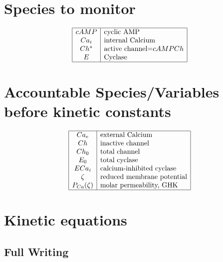 \documentclass[aps,12pt]{revtex4}
\begin{document}
\section{Species to monitor}
\begin{equation*}
\begin{array}{|c|l|}
\hline
	cAMP & \text{cyclic AMP}\\
	Ca_i & \text{internal Calcium}\\
    Ch^\ast & \text{active channel=}cAMPCh\\
    E     & \text{Cyclase} \\	
\hline
\end{array}
\end{equation*}

\section{Accountable Species/Variables before kinetic constants}

\begin{equation*}
\begin{array}{|c|l|}
\hline
	Ca_e & \text{external Calcium}\\
    Ch    & \text{inactive channel}\\
    Ch_0  & \text{total channel}\\
    E_0   & \text{total cyclase} \\	
    ECa_i & \text{calcium-inhibited cyclase}\\
    \zeta & \text{reduced membrane potential}\\
    P_{Ca}(\zeta) & \text{molar permeability, GHK}\\
\hline
\end{array}
\end{equation*}


\section{Kinetic equations}

\subsection{Full Writing}
\end{document}
